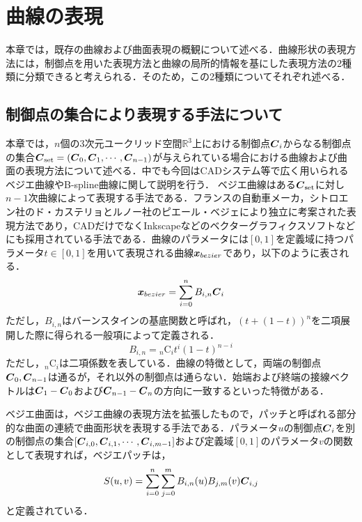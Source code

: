 \section{曲線の表現}
	本章では，既存の曲線および曲面表現の概観について述べる．曲線形状の表現方法には，制御点を用いた表現方法と曲線の局所的情報を基にした表現方法の2種類に分類できると考えられる．そのため，この2種類についてそれぞれ述べる．
	\subsection{制御点の集合により表現する手法について}
		本章では，$ n $個の3次元ユークリッド空間$ \mathbb{R}^3 $上における制御点$\boldsymbol{C}_i $からなる制御点の集合$ \boldsymbol{C}_{\mathrm{set}} =( \boldsymbol{C}_0,\boldsymbol{C}_1,\cdots,\boldsymbol{C}_{n-1})$が与えられている場合における曲線および曲面の表現方法について述べる．中でも今回はCADシステム等で広く用いられるベジエ曲線やB-spline曲線に関して説明を行う．
		ベジエ曲線はある$ \boldsymbol{C}_{\mathrm{set}} $に対し$ n-1 $次曲線によって表現する手法である．フランスの自動車メーカ，シトロエン社のド・カステリョとルノー社のピエール・ベジェにより独立に考案された表現方法であり，CADだけでなくInkscapeなどのベクターグラフィクスソフトなどにも採用されている手法である．曲線のパラメータには$ [0,1] $を定義域に持つパラメータ$ t \in [0,1]$を用いて表現される曲線$ \boldsymbol{x}_{bezier} $であり，以下のように表される．
		\begin{equation}\label{eq:bezier line}
			\boldsymbol{x}_{bezier} = \sum_{i=0}^{n} B_{i,n}\boldsymbol{C}_{i}
		\end{equation}
		ただし，$ B_{i,n} $はバーンスタインの基底関数と呼ばれ，$ (t+(1-t))^n $を二項展開した際に得られる一般項によって定義される．
		\begin{equation}\label{eq:bezier algorithm}
			B_{i,n} = {}_n \mathrm{C}_i t^i (1-t)^{n-i}
		\end{equation}
		ただし，$ {}_n \mathrm{C}_i $は二項係数を表している．曲線の特徴として，両端の制御点$ \boldsymbol{C}_{0},\boldsymbol{C}_{n-1} $は通るが，それ以外の制御点は通らない．始端および終端の接線ベクトルは$ \boldsymbol{C}_{1}-\boldsymbol{C}_{0} $および$ \boldsymbol{C}_{n-1}-\boldsymbol{C}_{n} $の方向に一致するといった特徴がある．
		
		ベジエ曲面は，ベジエ曲線の表現方法を拡張したもので，パッチと呼ばれる部分的な曲面の連続で曲面形状を表現する手法である．パラメータ$ u $の制御点$ \boldsymbol{C}_i $を別の制御点の集合$ [\boldsymbol{C}_{i,0},\boldsymbol{C}_{i,1},\cdots,\boldsymbol{C}_{i,m-1}] $および定義域$ [0,1] $のパラメータ$ v $の関数として表現すれば，ベジエパッチは，
		\begin{equation}\label{eq:BezierPatch}
			S(u,v) = \sum_{i=0}^{n} \sum_{j=0}^{m} B_{i,n}(u) B_{j,m}(v) \boldsymbol{C}_{i,j}
		\end{equation}
		と定義されている．
		
